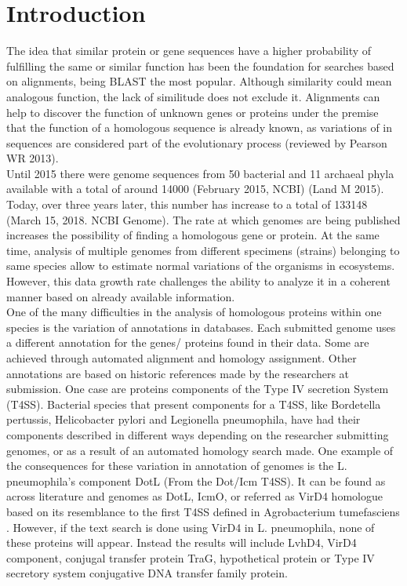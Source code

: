\documentclass[a4,center,fleqn]{NAR}
\begin{document}
\section{Introduction}

The idea that similar protein or gene sequences have a higher probability of fulfilling the same or similar function has been the foundation for searches based on alignments, being BLAST the most popular. Although similarity could mean analogous function, the lack of similitude does not exclude it. Alignments can help to discover the function of unknown genes or proteins under the premise that the function of a homologous sequence is already known, as variations of in sequences are considered part of the evolutionary process (reviewed by Pearson WR 2013).\\
Until 2015 there were genome sequences from 50 bacterial and 11 archaeal phyla available with a total of around 14000 (February 2015, NCBI) (Land M 2015). Today, over three years later,  this number has increase to a total of 133148 (March 15, 2018. NCBI Genome). The rate at which genomes are being published increases the possibility of finding a homologous gene or protein. At the same time, analysis of multiple genomes from different specimens (strains) belonging to same species allow to estimate normal variations of the organisms in ecosystems. However, this data growth rate challenges the ability to analyze it in a coherent manner based on already available information.\\	 

One of the many difficulties in the analysis of homologous proteins within one species is the variation of annotations in databases. Each submitted genome uses a different annotation for the genes/ proteins found in their data. Some are achieved through automated alignment and homology assignment. Other annotations are based on historic references made by the researchers at submission. One case are proteins components of the Type IV secretion System (T4SS). Bacterial species that present components for a T4SS, like Bordetella pertussis, Helicobacter pylori and Legionella pneumophila, have had their components described in different ways depending on the researcher submitting genomes,  or as a result of an automated homology search made. One example of the consequences for these variation in annotation of genomes is the L. pneumophila's component DotL (From the Dot/Icm T4SS). It can be found as across literature and genomes as DotL, IcmO, or referred as VirD4 homologue based on its resemblance to the first T4SS defined in Agrobacterium tumefasciens . However, if the text search is done using VirD4 in L. pneumophila, none of these proteins will appear. Instead the results will include LvhD4, VirD4 component, conjugal transfer protein TraG, hypothetical protein or Type IV secretory system conjugative DNA transfer family protein. 
\enlargethispage{-65.1pt}
\end{document}
